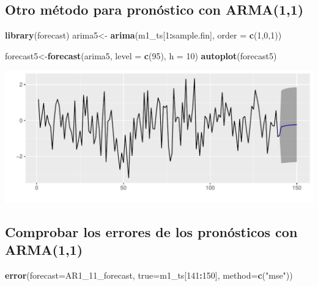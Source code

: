 \documentclass[
  11pt,
]{article}
\newenvironment{Shaded}{\begin{snugshade}}{\end{snugshade}}
\newcommand{\DataTypeTok}[1]{\textcolor[rgb]{0.13,0.29,0.53}{#1}}
\newcommand{\DecValTok}[1]{\textcolor[rgb]{0.00,0.00,0.81}{#1}}
\newcommand{\KeywordTok}[1]{\textcolor[rgb]{0.13,0.29,0.53}{\textbf{#1}}}
\newcommand{\NormalTok}[1]{#1}
\newcommand{\OperatorTok}[1]{\textcolor[rgb]{0.81,0.36,0.00}{\textbf{#1}}}
\newcommand{\StringTok}[1]{\textcolor[rgb]{0.31,0.60,0.02}{#1}}
\begin{document}
\hypertarget{otro-muxe9todo-para-pronuxf3stico-con-arma11}{%
\subsection{Otro método para pronóstico con
ARMA(1,1)}\label{otro-muxe9todo-para-pronuxf3stico-con-arma11}}

\begin{Shaded}
\begin{Highlighting}[]
\KeywordTok{library}\NormalTok{(forecast)}
\NormalTok{arima5<-}\StringTok{ }\KeywordTok{arima}\NormalTok{(m1_ts[}\DecValTok{1}\OperatorTok{:}\NormalTok{sample.fin], }\DataTypeTok{order =} \KeywordTok{c}\NormalTok{(}\DecValTok{1}\NormalTok{,}\DecValTok{0}\NormalTok{,}\DecValTok{1}\NormalTok{))}
\end{Highlighting}
\end{Shaded}

\begin{Shaded}
\begin{Highlighting}[]
\NormalTok{forecast5<-}\KeywordTok{forecast}\NormalTok{(arima5, }\DataTypeTok{level =} \KeywordTok{c}\NormalTok{(}\DecValTok{95}\NormalTok{), }\DataTypeTok{h =} \DecValTok{10}\NormalTok{)}
\KeywordTok{autoplot}\NormalTok{(forecast5)}
\end{Highlighting}
\end{Shaded}

\begin{center}\includegraphics[width=0.9\linewidth]{RmdFigs/f_otro2_2-1} \end{center}

\hypertarget{comprobar-los-errores-de-los-pronuxf3sticos-con-arma11}{%
\subsection{Comprobar los errores de los pronósticos con
ARMA(1,1)}\label{comprobar-los-errores-de-los-pronuxf3sticos-con-arma11}}

\begin{Shaded}
\begin{Highlighting}[]
\KeywordTok{error}\NormalTok{(}\DataTypeTok{forecast=}\NormalTok{AR1_}\DecValTok{11}\NormalTok{_forecast, }\DataTypeTok{true=}\NormalTok{m1_ts[}\DecValTok{141}\OperatorTok{:}\DecValTok{150}\NormalTok{], }\DataTypeTok{method=}\KeywordTok{c}\NormalTok{(}\StringTok{"mse"}\NormalTok{))}
\end{Highlighting}
\end{Shaded}
\end{document}
